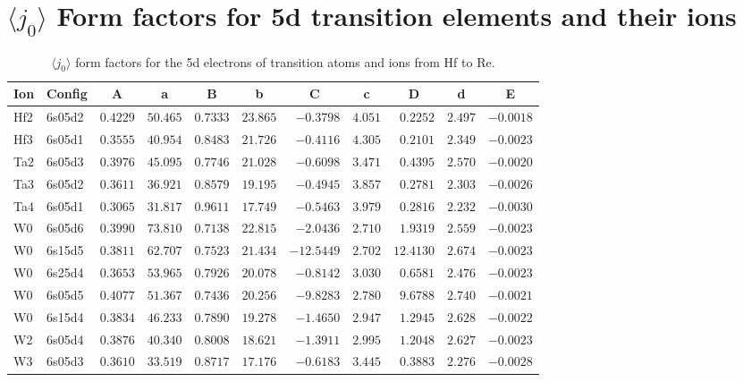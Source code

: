 \section{{\large$\langle j_0\rangle$ }Form factors for 5d transition elements and their ions}
\begin{table}[H]
 \caption{$\langle j_0\rangle$ form factors for the 5d electrons of transition atoms and ions from Hf to Re.\cite{kob:11}}
\label{5dj0} \vspace{1ex}
{\tablesize
\begin{tabular}{llrrrrrrrrr}
\hline
\multicolumn{1}{c}{ Ion}&\multicolumn{1}{c}{ Config}&\multicolumn{1}{c}{ A }&\multicolumn{1}{c}{  a }&\multicolumn{1}{c}{B }&\multicolumn{1}{c}{ b }&\multicolumn{1}{c}{ C }&\multicolumn{1}{c}{ c }&\multicolumn{1}{c}{ D }&\multicolumn{1}{c}{ d }&\multicolumn{1}{c}{E }\\
\hline
Hf2 & 6s05d2 &$0.4229$ &$50.465$ &$0.7333$ &$23.865$ &$-0.3798$ &$4.051$ &$0.2252$ &$2.497$ &$-0.0018$ \\
Hf3 & 6s05d1 &$0.3555$ &$40.954$ &$0.8483$ &$21.726$ &$-0.4116$ &$4.305$ &$0.2101$ &$2.349$ &$-0.0023$ \\
Ta2 & 6s05d3 &$0.3976$ &$45.095$ &$0.7746$ &$21.028$ &$-0.6098$ &$3.471$ &$0.4395$ &$2.570$ &$-0.0020$ \\
Ta3 & 6s05d2 &$0.3611$ &$36.921$ &$0.8579$ &$19.195$ &$-0.4945$ &$3.857$ &$0.2781$ &$2.303$ &$-0.0026$ \\
Ta4 & 6s05d1 &$0.3065$ &$31.817$ &$0.9611$ &$17.749$ &$-0.5463$ &$3.979$ &$0.2816$ &$2.232$ &$-0.0030$ \\
W0 & 6s05d6 &$0.3990$ &$73.810$ &$0.7138$ &$22.815$ &$-2.0436$ &$2.710$ &$1.9319$ &$2.559$ &$-0.0023$ \\
W0 & 6s15d5 &$0.3811$ &$62.707$ &$0.7523$ &$21.434$ &$-12.5449$ &$2.702$ &$12.4130$ &$2.674$ &$-0.0023$ \\
W0 & 6s25d4 &$0.3653$ &$53.965$ &$0.7926$ &$20.078$ &$-0.8142$ &$3.030$ &$0.6581$ &$2.476$ &$-0.0023$ \\
W0 & 6s05d5 &$0.4077$ &$51.367$ &$0.7436$ &$20.256$ &$-9.8283$ &$2.780$ &$9.6788$ &$2.740$ &$-0.0021$ \\
W0 & 6s15d4 &$0.3834$ &$46.233$ &$0.7890$ &$19.278$ &$-1.4650$ &$2.947$ &$1.2945$ &$2.628$ &$-0.0022$ \\
W2 & 6s05d4 &$0.3876$ &$40.340$ &$0.8008$ &$18.621$ &$-1.3911$ &$2.995$ &$1.2048$ &$2.627$ &$-0.0023$ \\
W3 & 6s05d3 &$0.3610$ &$33.519$ &$0.8717$ &$17.176$ &$-0.6183$ &$3.445$ &$0.3883$ &$2.276$ &$-0.0028$ \\

\end{tabular}}
\end{table}
